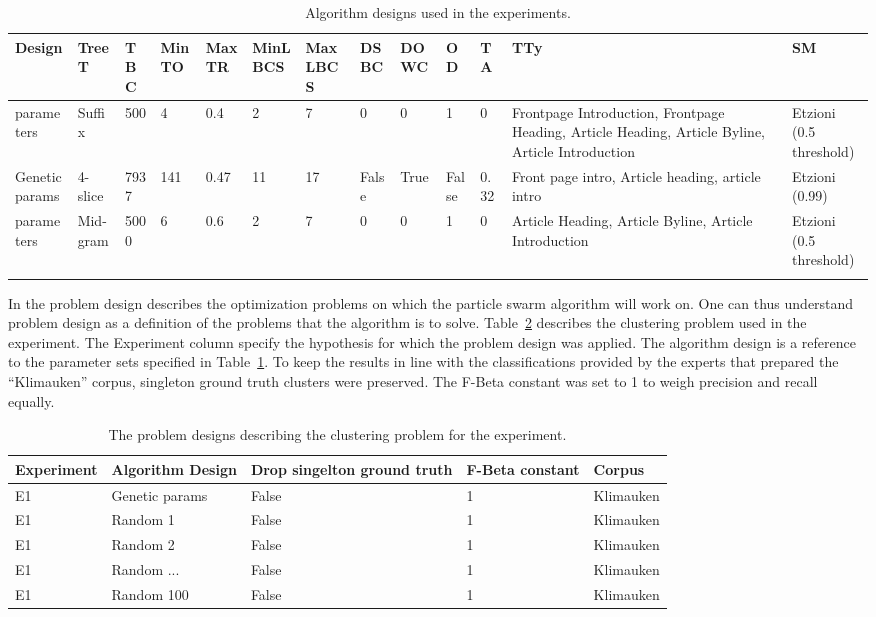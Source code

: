 \begin{landscape}
\begin{center}
\footnotesize
  \begin{longtable}{|p{1.5cm}|p{1.5cm}|p{1cm}|p{1.5cm}|p{1.5cm}|p{1.5cm}|p{1.5cm}|p{1.2cm}|p{1.5cm}|p{0.8cm}|p{1cm}|p{2.5cm}|p{1.5cm}|}
  \hline
  Design & TreeT & TBC & MinTO & MaxTR & MinLBCS & MaxLBCS & DSBC & DOWC & OD & TA & TTy & SM\\
  \hline
  \endhead
  \citeauthor{Oren1998} parameters & Suffix & 500 & 4 & 0.4 & 2 & 7 & 0 & 0 & 1 & 0 & Frontpage Introduction, Frontpage Heading, Article Heading, Article Byline, Article Introduction & Etzioni (0.5 threshold)\\
  \hline
  Genetic params & 4-slice & 7937 & 141 & 0.47 & 11 & 17 & False & True & False & 0.32 & Front page intro, Article heading, article intro & Etzioni (0.99) \\
  \hline
  \citeauthor{Moe2013} parameters & Mid-gram & 5000 & 6 & 0.6 & 2 & 7 & 0 & 0 & 1 & 0 & Article Heading, Article Byline, Article Introduction & Etzioni (0.5 threshold)\\
  \hline
    \caption{Algorithm designs used in the experiments.}
	\label{tab:algorithmdesign}
  \end{longtable}
\end{center}
\end{landscape}

In  the problem design describes the optimization problems on which the particle swarm algorithm will work on. One can thus understand problem design as a definition of the problems that the algorithm is to solve. Table~\ref{tab:problemdesign} describes the clustering problem used in the experiment. The Experiment column specify the hypothesis for which the problem design was applied. The algorithm design is a reference to the parameter sets specified in Table~\ref{tab:algorithmdesign}. To keep the results in line with the classifications provided by the experts that prepared the ``Klimauken'' corpus, singleton ground truth clusters were preserved. The F-Beta constant was set to 1 to weigh precision and recall equally.

\begin{table}
\small
\begin{center}
  \begin{tabular}{|l|p{2.5cm}|l|l|l|}
  \hline
  Experiment & Algorithm Design & Drop singelton ground truth & F-Beta constant & Corpus\\ 
  \hline
  E1 & Genetic params & False & 1 & Klimauken\\
  \hline
  E1 & Random 1 & False & 1 & Klimauken\\
  \hline
  E1 & Random 2 & False & 1 & Klimauken\\
  \hline
  E1 & Random ... & False & 1 & Klimauken\\
  \hline
  E1 & Random 100 & False & 1 & Klimauken\\
  \hline
  \end{tabular}
\end{center}
\caption{The problem designs describing the clustering problem for the experiment.}
\label{tab:problemdesign}
\end{table}